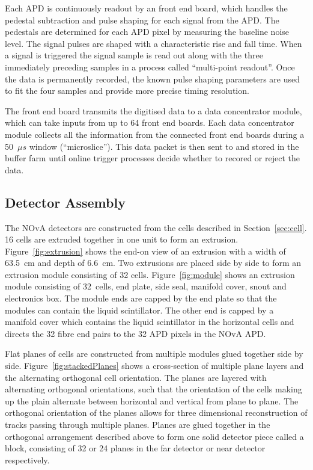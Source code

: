 Each APD is continuously readout by an front end board, which handles the pedestal
subtraction and
pulse shaping for each signal from the APD. The pedestals are
determined for each APD pixel by measuring the baseline noise level.
The signal pulses are shaped with a characteristic rise and fall
time. When a signal is triggered the signal sample is read out along
with the three immediately preceding samples in a process called
``multi-point readout''. Once the data is permanently recorded, the
known pulse shaping 
parameters are used to fit the four samples and provide more
precise timing resolution. 

The front end board transmits the digitised data to a data
concentrator module, which can take inputs from up to 64 front end
boards. 
Each data concentrator module collects all the information from the connected front end boards during a
50~$\mu s$ window (``microslice''). 
This data packet is then sent to and stored in the buffer farm
until online trigger processes decide whether to recored or reject the
data. 


\subsection{Detector Assembly} \label{sec:detAssembly}

The NOvA detectors are constructed from the cells described
in Section~\ref{sec:cell}. 16 cells are extruded together in one unit
to form an extrusion.
Figure~\ref{fig:extrusion} shows the end-on view of an extrusion with
a width of 63.5~cm and depth of 6.6~cm. 
Two extrusions are placed side by side to form an extrusion module
consisting of 32 cells.
Figure~\ref{fig:module} shows an extrusion module consisting of
32~cells, end plate, side seal, manifold cover, snout and
electronics box.
The
module ends are capped by the end plate so that the modules can
contain the liquid scintillator. The other end is capped by a manifold
cover which contains the liquid scintillator in the horizontal cells
and directs the 32 fibre end pairs to the 32 APD pixels in the NOvA
APD. 

Flat planes of cells are constructed from multiple modules glued
together side by side. 
Figure~\ref{fig:stackedPlanes} shows a cross-section of multiple plane
layers and the alternating orthogonal cell orientation.
The planes are layered with alternating orthogonal
orientations, such that the orientation of the cells making up the
plain alternate between horizontal and vertical from plane to
plane. The orthogonal 
orientation of the planes allows for three dimensional reconstruction
of tracks passing through multiple planes. Planes are glued together
in the orthogonal arrangement described above to form one solid
detector piece called a block, consisting of 32 or 24 planes in the
far detector or near detector respectively.


